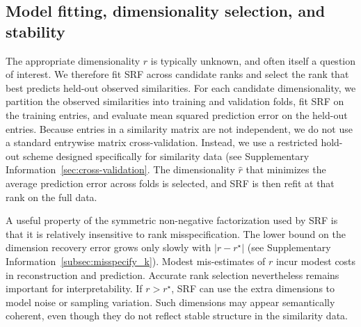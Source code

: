 \documentclass{article}
\begin{document}
\subsection{Model fitting, dimensionality selection, and stability}

The appropriate dimensionality $r$ is typically unknown, and often itself a question of interest. We therefore fit SRF across candidate ranks and select the rank that best predicts held-out observed similarities. For each candidate dimensionality, we partition the observed similarities into training and validation folds, fit SRF on the training entries, and evaluate mean squared prediction error on the held-out entries. Because entries in a similarity matrix are not independent, we do not use a standard entrywise matrix cross-validation. Instead, we use a restricted hold-out scheme designed specifically for similarity data (see Supplementary Information~\ref{sec:cross-validation}. The dimensionality $\hat r$ that minimizes the average prediction error across folds is selected, and SRF is then refit at that rank on the full data.

A useful property of the symmetric non-negative factorization used by SRF is that it is relatively insensitive to rank misspecification. The lower bound on the dimension recovery error grows only slowly with $\vert r - r^{\star} \vert$ (see Supplementary Information~\ref{subsec:misspecify_k}). Modest mis-estimates of $r$ incur modest costs in reconstruction and prediction. Accurate rank selection nevertheless remains important for interpretability. If $r > r^{\star}$, SRF can use the extra dimensions to model noise or sampling variation. Such dimensions may appear semantically coherent, even though they do not reflect stable structure in the similarity data.
\end{document}
